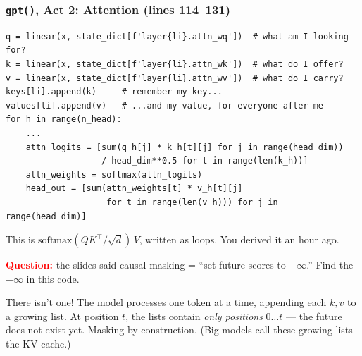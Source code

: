 \begin{frame}[fragile]
    \frametitle{\texttt{gpt()}, Act 2: Attention (lines 114--131)}

\begin{lstlisting}
q = linear(x, state_dict[f'layer{li}.attn_wq'])  # what am I looking for?
k = linear(x, state_dict[f'layer{li}.attn_wk'])  # what do I offer?
v = linear(x, state_dict[f'layer{li}.attn_wv'])  # what do I carry?
keys[li].append(k)     # remember my key...
values[li].append(v)   # ...and my value, for everyone after me
for h in range(n_head):
    ...
    attn_logits = [sum(q_h[j] * k_h[t][j] for j in range(head_dim))
                   / head_dim**0.5 for t in range(len(k_h))]
    attn_weights = softmax(attn_logits)
    head_out = [sum(attn_weights[t] * v_h[t][j]
                    for t in range(len(v_h))) for j in range(head_dim)]
\end{lstlisting}

    This is $\mathrm{softmax}(QK^\top/\sqrt{d})\,V$, written as loops. You derived it an hour ago.

    \pause

    \textcolor{red}{\textbf{Question:}} the slides said causal masking = ``set future scores to $-\infty$.'' \alert{Find the $-\infty$ in this code.}

    \pause

    \alert{There isn't one!} The model processes \alert{one token at a time}, appending each $k, v$ to a growing list. At position $t$, the lists contain \emph{only positions} $0 \dots t$ --- \alert{the future does not exist yet}. Masking by construction. (Big models call these growing lists the \alert{KV cache}.)
\end{frame}

